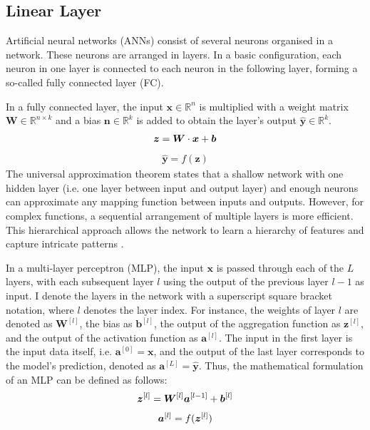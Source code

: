 \subsection{Linear Layer}
Artificial neural networks (ANNs) consist of several neurons organised in a network. These neurons are arranged in layers. In a basic configuration, each neuron in one layer is connected to each neuron in the following layer, forming a so-called fully connected layer (FC).

In a fully connected layer, the input $\boldsymbol{x} \in \mathbb{R}^n$ is multiplied with a weight matrix $\boldsymbol{W} \in \mathbb{R}^{n\times k}$ and a bias $\boldsymbol{n} \in \mathbb{R}^k$ is added to obtain the layer's output $\boldsymbol{\hat{y}} \in \mathbb{R}^k$.
\begin{align}\eqlbl{nn3}%
	\boldsymbol{z} = \boldsymbol{W} \cdot \boldsymbol{x} + \boldsymbol{b}
\end{align}
\begin{align}
	\hat{\boldsymbol{y}} = f(\boldsymbol{z})
\end{align}
%
The universal approximation theorem  states that a shallow network with one hidden layer (i.e. one layer between input and output layer) and enough neurons can approximate any mapping function between inputs and outputs.
However, for complex functions, a sequential arrangement of multiple layers is more efficient. This hierarchical approach allows the network to learn a hierarchy of features and capture intricate patterns .

In a multi-layer perceptron (MLP), the input \(\boldsymbol{x}\) is passed through each of the $L$ layers, with each subsequent layer \(l\) using the output of the previous layer \(l-1\) as input.
I denote the layers in the network with a superscript square bracket notation, where $l$ denotes the layer index. 
For instance, the weights of layer $l$ are denoted as $\boldsymbol{W}^{[l]}$, the bias as \(\boldsymbol{b}^{[l]}\), the output of the aggregation function as \(\boldsymbol{z}^{[l]}\), and the output of the activation function as \(\boldsymbol{a}^{[l]}\).
The input in the first layer is the input data itself, i.e. $\boldsymbol{a}^{[0]} = \boldsymbol{x}$, and the output of the last layer  corresponds to the model's prediction, denoted as $\boldsymbol{a}^{[L]} = \hat{\boldsymbol{y}}$. Thus,  the mathematical formulation of an MLP can be defined as follows:
%
\begin{align}\eqlbl{mlp}
		\boldsymbol{z}^{[l]} = \boldsymbol{W}^{[l]}\boldsymbol{a}^{[l-1]} + \boldsymbol{b}^{[l]}
\end{align}
%
\begin{align}\eqlbl{mlp2}
		\boldsymbol{a}^{[l]} = f(\boldsymbol{z}^{[l]})
\end{align}




